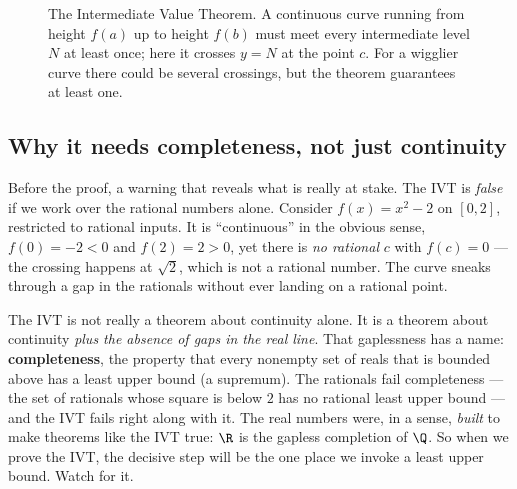 \begin{figure}[H]
\centering
{}
\caption{The Intermediate Value Theorem. A continuous curve running from height $f(a)$ up
to height $f(b)$ must meet every intermediate level $N$ at least once; here it crosses
$y=N$ at the point $c$. For a wigglier curve there could be several crossings, but the
theorem guarantees at least one.}
\label{ch08:fig-ivt}
\end{figure}

\subsection{Why it needs completeness, not just continuity}

Before the proof, a warning that reveals what is really at stake. The IVT is \emph{false}
if we work over the rational numbers alone. Consider $f(x)=x^2-2$ on $[0,2]$, restricted to
rational inputs. It is ``continuous'' in the obvious sense, $f(0)=-2<0$ and $f(2)=2>0$, yet
there is \emph{no rational} $c$ with $f(c)=0$ --- the crossing happens at $\sqrt 2$, which
is not a rational number. The curve sneaks through a gap in the rationals without ever
landing on a rational point.

\begin{happeningbox}
The IVT is not really a theorem about continuity alone. It is a theorem about continuity
\emph{plus the absence of gaps in the real line}. That gaplessness has a name:
\textbf{completeness}, the property that every nonempty set of reals that is bounded above
has a least upper bound (a supremum). The rationals fail completeness --- the set of
rationals whose square is below $2$ has no rational least upper bound --- and the IVT fails
right along with it. The real numbers were, in a sense, \emph{built} to make theorems like
the IVT true: $\R$ is the gapless completion of $\Q$. So when we prove the IVT, the
decisive step will be the one place we invoke a least upper bound. Watch for it.
\end{happeningbox}

